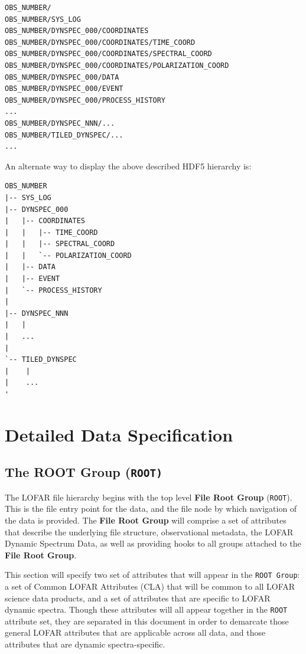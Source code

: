 \documentclass[a4paper,10pt,bibtotoc]{scrartcl}
\begin{document}
\begin{lstlisting}
OBS_NUMBER/
OBS_NUMBER/SYS_LOG
OBS_NUMBER/DYNSPEC_000/COORDINATES
OBS_NUMBER/DYNSPEC_000/COORDINATES/TIME_COORD
OBS_NUMBER/DYNSPEC_000/COORDINATES/SPECTRAL_COORD
OBS_NUMBER/DYNSPEC_000/COORDINATES/POLARIZATION_COORD
OBS_NUMBER/DYNSPEC_000/DATA
OBS_NUMBER/DYNSPEC_000/EVENT
OBS_NUMBER/DYNSPEC_000/PROCESS_HISTORY
...
OBS_NUMBER/DYNSPEC_NNN/...
OBS_NUMBER/TILED_DYNSPEC/...
...
\end{lstlisting}

An alternate way to display the above described HDF5 hierarchy is:

\begin{lstlisting}
OBS_NUMBER
|-- SYS_LOG
|-- DYNSPEC_000
|   |-- COORDINATES
|   |   |-- TIME_COORD
|   |   |-- SPECTRAL_COORD
|   |   `-- POLARIZATION_COORD
|   |-- DATA
|   |-- EVENT
|   `-- PROCESS_HISTORY
|
|-- DYNSPEC_NNN
|   |
|   ...
|
`-- TILED_DYNSPEC
|    |
|    ...
'
\end{lstlisting}


\section{Detailed Data Specification}
\label{sec:detailed structure}

   


\subsection{The ROOT Group (\tt{ROOT})}
\label{sec:root group}

The LOFAR file hierarchy begins with the top level \textbf{File Root
  Group} (\verb|ROOT|). This is the file entry point for the data, and
the file node by which navigation of the data is provided.  The
\textbf{File Root Group} will comprise a set of attributes that describe
the underlying file structure, observational metadata, the LOFAR
Dynamic Spectrum Data, as well as providing hooks to all groups attached to
the \textbf{File Root Group}. 

This section will specify two set of attributes that will appear in the \texttt{ROOT Group}: a set of Common LOFAR Attributes (CLA) that will be common to all LOFAR science data products, and a set of attributes that are specific to LOFAR dynamic spectra.  Though these attributes will all appear together in the \texttt{ROOT} attribute set, they are separated in this document in order to demarcate those general LOFAR attributes that are applicable across all data, and those attributes that are dynamic spectra-specific.
\end{document}
